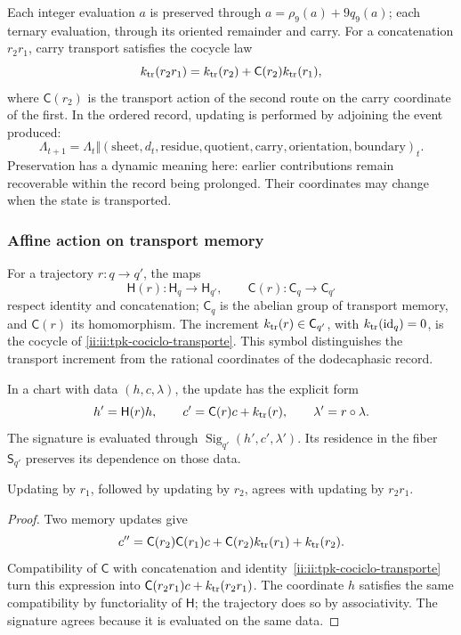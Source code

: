 Each integer evaluation \(a\) is preserved through
\(a=\rho_9(a)+9q_9(a)\); each ternary evaluation, through its oriented
remainder and carry. For a concatenation \(r_2r_1\), carry
transport satisfies the cocycle law
\begin{equation}
 k_{\rm tr}(r_2r_1)
 =k_{\rm tr}(r_2)+\mathsf C(r_2)k_{\rm tr}(r_1),
 \label{ii:ii:tpk-cociclo-transporte}
\end{equation}
where \(\mathsf C(r_2)\) is the transport action of the second route
on the carry coordinate of the first. In the ordered record,
updating is performed by adjoining the event produced:
\[
 \Lambda_{t+1}=\Lambda_t\Vert
 (\text{sheet},d_t,\text{residue},\text{quotient},
   \text{carry},\text{orientation},\text{boundary})_t.
\]
Preservation has a dynamic meaning here: earlier contributions
remain recoverable within the record being prolonged.
Their coordinates may change when the state is transported.

\subsubsection{Affine action on transport memory}

For a trajectory \(r:q\to q'\), the maps
\[
 \mathsf H(r):\mathsf H_q\to\mathsf H_{q'},\qquad
 \mathsf C(r):\mathsf C_q\to\mathsf C_{q'}
\]
respect identity and concatenation; \(\mathsf C_q\) is the abelian
group of transport memory, and \(\mathsf C(r)\) its homomorphism.
The increment \(k_{\rm tr}(r)\in\mathsf C_{q'}\), with
\(k_{\rm tr}(\operatorname{id}_q)=0\), is the cocycle of
\eqref{ii:ii:tpk-cociclo-transporte}. This symbol distinguishes the transport
increment from the rational coordinates of the dodecaphasic record.

In a chart with data \((h,c,\lambda)\), the update has the explicit form
\begin{equation}
 h'=\mathsf H(r)h,\qquad
 c'=\mathsf C(r)c+k_{\rm tr}(r),\qquad
 \lambda'=r\circ\lambda.
 \label{ii:ii:tpk-accion-afin}
\end{equation}
The signature is evaluated through
\(\operatorname{Sig}_{q'}(h',c',\lambda')\). Its residence in the
fiber \(\mathsf S_{q'}\) preserves its dependence on those data.

\begin{proposition}
\label{ii:ii:tpk-composicion-afin}
Updating by \(r_1\), followed by updating by
\(r_2\), agrees with updating by \(r_2r_1\).
\end{proposition}
\begin{proof}
Two memory updates give
\[
 c''=\mathsf C(r_2)\mathsf C(r_1)c
       +\mathsf C(r_2)k_{\rm tr}(r_1)+k_{\rm tr}(r_2).
\]
Compatibility of \(\mathsf C\) with concatenation and
identity~\eqref{ii:ii:tpk-cociclo-transporte} turn this expression
into \(\mathsf C(r_2r_1)c+k_{\rm tr}(r_2r_1)\).
The coordinate \(h\) satisfies the same compatibility by
functoriality of \(\mathsf H\); the trajectory does so by
associativity. The signature agrees because it is evaluated on the same data.
\end{proof}

